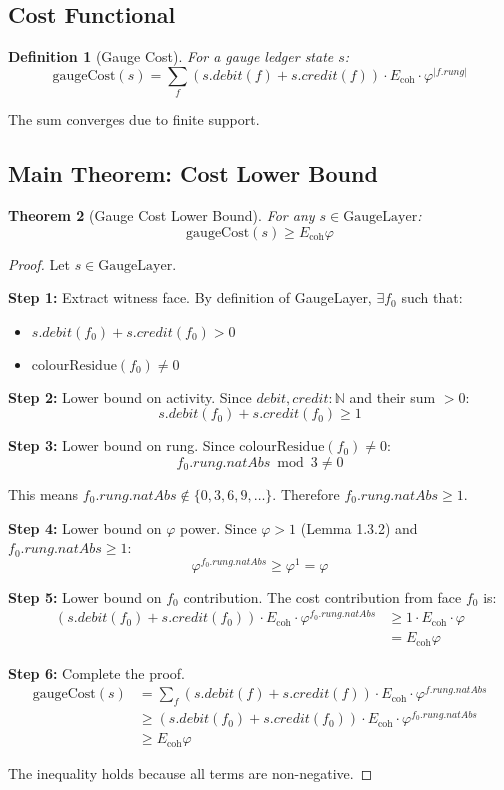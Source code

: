 \documentclass[11pt]{article}
\numberwithin{equation}{section}
\newtheorem{theorem}{Theorem}[section]
\newtheorem{definition}[theorem]{Definition}
\theoremstyle{remark}
\newcommand{\Ecoh}{E_{\text{coh}}}
\newcommand{\N}{\mathbb{N}}
\begin{document}
\subsection{Cost Functional}

\begin{definition}[Gauge Cost]
For a gauge ledger state $s$:
\[\text{gaugeCost}(s) = \sum_f (s.debit(f) + s.credit(f)) \cdot \Ecoh \cdot \varphi^{|f.rung|}\]
\end{definition}

The sum converges due to finite support.

\subsection{Main Theorem: Cost Lower Bound}

\begin{theorem}[Gauge Cost Lower Bound]
For any $s \in \text{GaugeLayer}$:
\[\text{gaugeCost}(s) \geq \Ecoh \varphi\]
\end{theorem}

\begin{proof}
Let $s \in \text{GaugeLayer}$.

\textbf{Step 1:} Extract witness face.
By definition of GaugeLayer, $\exists f_0$ such that:
\begin{itemize}
\item $s.debit(f_0) + s.credit(f_0) > 0$
\item $\text{colourResidue}(f_0) \neq 0$
\end{itemize}

\textbf{Step 2:} Lower bound on activity.
Since $debit, credit : \N$ and their sum $> 0$:
\[s.debit(f_0) + s.credit(f_0) \geq 1\]

\textbf{Step 3:} Lower bound on rung.
Since $\text{colourResidue}(f_0) \neq 0$:
\[f_0.rung.natAbs \bmod 3 \neq 0\]

This means $f_0.rung.natAbs \notin \{0, 3, 6, 9, \ldots\}$.
Therefore $f_0.rung.natAbs \geq 1$.

\textbf{Step 4:} Lower bound on $\varphi$ power.
Since $\varphi > 1$ (Lemma 1.3.2) and $f_0.rung.natAbs \geq 1$:
\[\varphi^{f_0.rung.natAbs} \geq \varphi^1 = \varphi\]

\textbf{Step 5:} Lower bound on $f_0$ contribution.
The cost contribution from face $f_0$ is:
\begin{align}
(s.debit(f_0) + s.credit(f_0)) \cdot \Ecoh \cdot \varphi^{f_0.rung.natAbs} 
&\geq 1 \cdot \Ecoh \cdot \varphi\\
&= \Ecoh \varphi
\end{align}

\textbf{Step 6:} Complete the proof.
\begin{align}
\text{gaugeCost}(s) &= \sum_f (s.debit(f) + s.credit(f)) \cdot \Ecoh \cdot \varphi^{f.rung.natAbs}\\
&\geq (s.debit(f_0) + s.credit(f_0)) \cdot \Ecoh \cdot \varphi^{f_0.rung.natAbs}\\
&\geq \Ecoh \varphi
\end{align}

The inequality holds because all terms are non-negative.
\end{proof}
\end{document}
